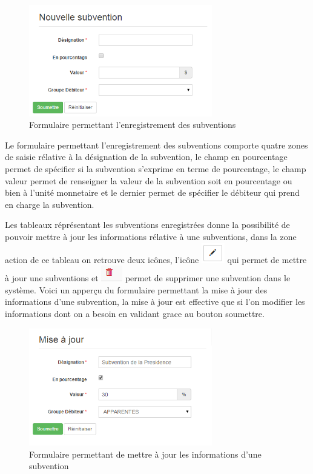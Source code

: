 \documentclass[12pt,a4paper]{report}
\begin{document}
\begin{figure}[h]
\begin{center}
\includegraphics[width=8cm]{pic/FormSubvention.png}
\end{center}
\caption{Formulaire permettant l'enregistrement des subventions}
\label{Formulaire permettant l'enregistrement des subventions}
\end{figure} 

Le formulaire permettant l'enregistrement des subventions comporte quatre zones de saisie rélative à la désignation de la subvention, le champ en pourcentage permet de spécifier si la subvention s'exprime en terme  de pourcentage, le champ valeur permet de renseigner la valeur de la subvention soit en pourcentage ou bien à l'unité monnetaire et le dernier permet de spécifier le débiteur qui prend en charge la subvention. 

Les tableaux réprésentant les subventions enregistrées donne la possibilité de pouvoir mettre à jour les informations rélative à une subventions, dans la zone action de ce tableau on retrouve deux icônes, l'icône \includegraphics[scale=0.7]{pic/EditBlack.png} qui permet de mettre à jour une subventions et \includegraphics[scale=0.7]{pic/DeleteWRed.png} permet de supprimer une subvention dans le système.
Voici un apperçu du formulaire permettant la mise à jour des informations d'une subvention, la mise à jour est effective que si l'on modifier les informations dont on a besoin en validant grace au bouton soumettre. 

\begin{figure}[h]
\begin{center}
\includegraphics[width=8cm]{pic/FormUpSubventions.png}
\end{center}
\caption{Formulaire permettant de mettre à jour les informations d'une subvention}
\label{Formulaire permettant de mettre à jour les informations d'une subvention}
\end{figure} 
\end{document}
